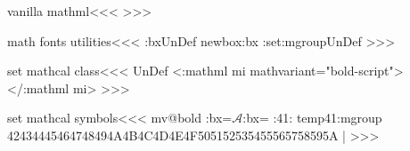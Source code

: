 {{{{{{\<vanilla mathml\><<<
   {\EndP{}} 
   {}
   {}   {}
   {}   {}
>>>














\<math fonts utilities\><<<
\ifx \tmp:bx\:UnDef \csname newbox\endcsname \tmp:bx \fi
\ifx \find:set:mgroup\:UnDef 
   \def\find:set:mgroup#1#2#3{\bgroup
     \def\use@mathgroup##1##2##3{\relax
       \tmp:cnt=##2%
       \xdef\:temp####1{\noexpand\Configure{MathClass}{#2}%
           {}{}{}{\mathchar"0\the\tmp:cnt ####1}}%
     }%
     \setbox\tmp:bx=\hbox{$#1$}\setbox\tmp:bx=\hbox{}%
     \set:mgroup#3{}{}%
     \egroup
   }
\fi
\def\set:mgroup#1#2{\if :#1#2:\else
   \:temp{#1#2}\expandafter\set:mgroup \fi}
>>>



\<set mathcal class\><<<
\ifx \mathboldcalMathClass\:UnDef
  \NewMathClass\mathboldcalMathClass
\fi
{}
    {<\a:mathml mi\Hnewline
         mathvariant="bold-script">}{</\a:mathml mi>}{}  
>>>

\<set mathcal symbols\><<<
\expandafter\ifx\csname mv@bold\endcsname\relax  \else
\bgroup
{}%
\find:set:mgroup{\mathcal{A}}{\mathboldcalMathClass}%
  {4142434445464748494A4B4C4D4E4F505152535455565758595A} |%
\egroup
\fi
>>>

}}}}}}
